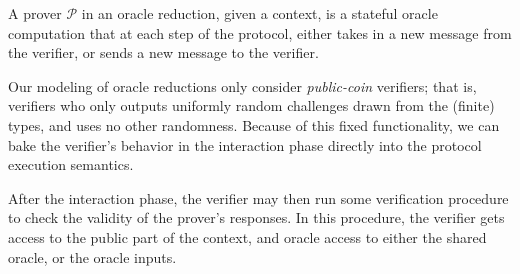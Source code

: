 

\begin{definition}
    \label{def:prover_type_signature}
    A prover $\mathcal{P}$ in an oracle reduction, given a context, is a stateful oracle computation
    that at each step of the protocol, either takes in a new message from the verifier, or sends a
    new message to the verifier.
\end{definition}

Our modeling of oracle reductions only consider \emph{public-coin} verifiers; that is, verifiers who
only outputs uniformly random challenges drawn from the (finite) types, and uses no other
randomness. Because of this fixed functionality, we can bake the verifier's behavior in the
interaction phase directly into the protocol execution semantics.

After the interaction phase, the verifier may then run some verification procedure to check the
validity of the prover's responses. In this procedure, the verifier gets access to the public part
of the context, and oracle access to either the shared oracle, or the oracle inputs.

